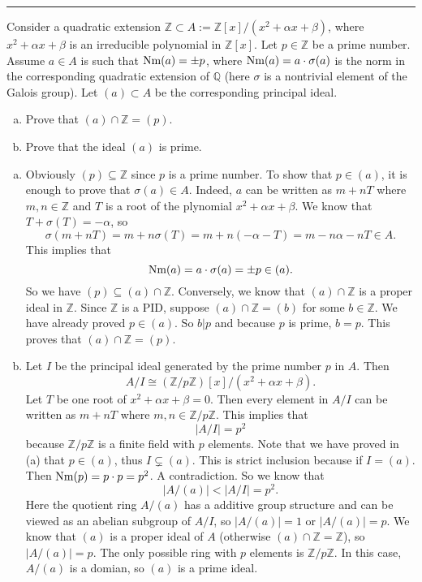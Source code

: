 \documentclass[letterpaper, 12pt]{article}
\begin{document}
\noindent\rule{7in}{2.8pt}
\begin{problem}{5}
Consider a quadratic extension \(\mathbb{Z}\subset A:=\mathbb{Z}[x]/(x^2+\alpha x+\beta)\), where \(x^2+\alpha x+\beta\) is an irreducible polynomial in \(\mathbb{Z}[x]\). Let \(p\in \mathbb{Z}\) be a prime number. Assume \(a\in A\) is such that \(\text{Nm}(a)=\pm p\), where \(\text{Nm}(a)=a\cdot \sigma(a)\) is the norm in the corresponding quadratic extension of \(\mathbb{Q}\) (here \(\sigma\) is a nontrivial element of the Galois group). Let \((a)\subset A\) be the corresponding principal ideal. 
\begin{enumerate}[(a)]
\item Prove that \((a)\cap \mathbb{Z}=(p)\).
\item Prove that the ideal \((a)\) is prime. 
\end{enumerate}
\end{problem}
\begin{solution}
\begin{enumerate}[(a)]
\item Obviously \((p)\subseteq \mathbb{Z}\) since \(p\) is a prime number. To show that \(p\in (a)\), it is enough to prove that \(\sigma(a)\in A\). Indeed, \(a\) can be written as \(m+nT\) where \(m,n\in \mathbb{Z}\) and \(T\) is a root of the plynomial \(x^2+\alpha x+\beta\). We know that \(T+\sigma(T)=-\alpha\), so 
\[\sigma(m+nT)=m+n\sigma(T)=m+n(-\alpha-T)=m-n\alpha-nT\in A.\]
This implies that 
\[\text{Nm}(a)=a\cdot \sigma(a)=\pm p\in (a).\]
So we have \((p)\subseteq (a)\cap \mathbb{Z}\). Conversely, we know that \((a)\cap \mathbb{Z}\) is a proper ideal in \(\mathbb{Z}\). Since \(\mathbb{Z}\) is a PID, suppose \((a)\cap \mathbb{Z}=(b)\) for some \(b\in \mathbb{Z}\). We have already proved \(p\in (a)\). So \(b|p\) and because \(p\) is prime, \(b=p\). This proves that \((a)\cap \mathbb{Z}=(p)\).
\item Let \(I\) be the principal ideal generated by the prime number \(p\) in \(A\). Then 
\[A/I\cong (\mathbb{Z}/p \mathbb{Z})[x]/(x^2+\alpha x+\beta).\]
Let \(T\) be one root of \(x^2+\alpha x+\beta=0\). Then every element in \(A/I\) can be written as \(m+nT\) where \(m,n\in \mathbb{Z}/p \mathbb{Z}\). This implies that 
\[|A/I|=p^2\]
because \(\mathbb{Z}/p \mathbb{Z}\) is a finite field with \(p\) elements. Note that we have proved in (a) that \(p\in (a)\), thus \(I\subsetneq (a)\). This is strict inclusion because if \(I=(a)\). Then \(\text{Nm}(p)=p\cdot p=p^2\). A contradiction. So we know that 
\[|A/(a)|<|A/I|=p^2.\]
Here the quotient ring \(A/(a)\) has a additive group structure and can be viewed as an abelian subgroup of \(A/I\), so \(|A/(a)|=1\) or \(|A/(a)|=p\). We know that \((a)\) is a proper ideal of \(A\) (otherwise \((a)\cap \mathbb{Z}=\mathbb{Z}\)), so \(|A/(a)|=p\). The only possible ring with \(p\) elements is \(\mathbb{Z}/p \mathbb{Z}\). In this case, \(A/(a)\) is a domian, so \((a)\) is a prime ideal.  
\end{enumerate}
\end{solution}
\end{document}
